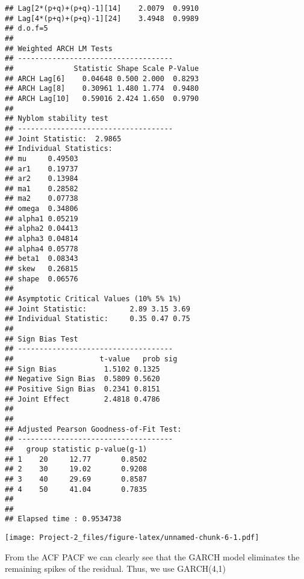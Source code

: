\documentclass[]{article}
\newenvironment{Shaded}{\begin{snugshade}}{\end{snugshade}}
\newcommand{\KeywordTok}[1]{\textcolor[rgb]{0.13,0.29,0.53}{\textbf{#1}}}
\newcommand{\DataTypeTok}[1]{\textcolor[rgb]{0.13,0.29,0.53}{#1}}
\newcommand{\StringTok}[1]{\textcolor[rgb]{0.31,0.60,0.02}{#1}}
\newcommand{\CommentTok}[1]{\textcolor[rgb]{0.56,0.35,0.01}{\textit{#1}}}
\newcommand{\OperatorTok}[1]{\textcolor[rgb]{0.81,0.36,0.00}{\textbf{#1}}}
\newcommand{\NormalTok}[1]{#1}
\begin{document}
\begin{verbatim}
## Lag[2*(p+q)+(p+q)-1][14]    2.0079  0.9910
## Lag[4*(p+q)+(p+q)-1][24]    3.4948  0.9989
## d.o.f=5
## 
## Weighted ARCH LM Tests
## ------------------------------------
##              Statistic Shape Scale P-Value
## ARCH Lag[6]    0.04648 0.500 2.000  0.8293
## ARCH Lag[8]    0.30961 1.480 1.774  0.9480
## ARCH Lag[10]   0.59016 2.424 1.650  0.9790
## 
## Nyblom stability test
## ------------------------------------
## Joint Statistic:  2.9865
## Individual Statistics:              
## mu     0.49503
## ar1    0.19737
## ar2    0.13984
## ma1    0.28582
## ma2    0.07738
## omega  0.34806
## alpha1 0.05219
## alpha2 0.04413
## alpha3 0.04814
## alpha4 0.05778
## beta1  0.08343
## skew   0.26815
## shape  0.06576
## 
## Asymptotic Critical Values (10% 5% 1%)
## Joint Statistic:          2.89 3.15 3.69
## Individual Statistic:     0.35 0.47 0.75
## 
## Sign Bias Test
## ------------------------------------
##                    t-value   prob sig
## Sign Bias           1.5102 0.1325    
## Negative Sign Bias  0.5809 0.5620    
## Positive Sign Bias  0.2341 0.8151    
## Joint Effect        2.4818 0.4786    
## 
## 
## Adjusted Pearson Goodness-of-Fit Test:
## ------------------------------------
##   group statistic p-value(g-1)
## 1    20     12.77       0.8502
## 2    30     19.02       0.9208
## 3    40     29.69       0.8587
## 4    50     41.04       0.7835
## 
## 
## Elapsed time : 0.9534738
\end{verbatim}

\begin{Shaded}
\end{Shaded}

\texttt{[image: Project-2\_files/figure-latex/unnamed-chunk-6-1.pdf]}

From the ACF PACF we can clearly see that the GARCH model eliminates the
remaining spikes of the residual. Thus, we use GARCH(4,1)
\end{document}
